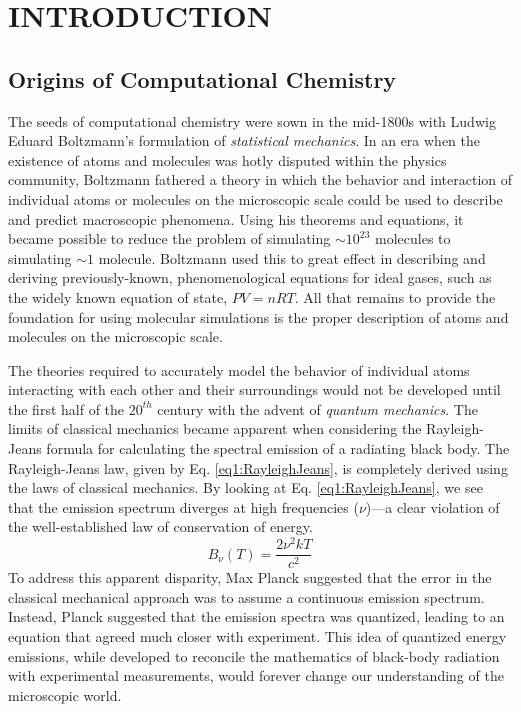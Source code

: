 \chapter{INTRODUCTION}
\label{ch1}

\section{Origins of Computational Chemistry}
The seeds of computational chemistry were sown in the mid-1800s with Ludwig
Eduard Boltzmann's formulation of \emph{statistical mechanics}. In an era when
the existence of atoms and molecules was hotly disputed within the physics
community, Boltzmann fathered a theory in which the behavior and interaction of
individual atoms or molecules on the microscopic scale could be used to
describe and predict macroscopic phenomena. Using his theorems and equations,
it became possible to reduce the problem of simulating $\sim 10^{23}$ molecules
to simulating $\sim 1$ molecule. Boltzmann used this to great effect in
describing and deriving previously-known, phenomenological equations for ideal
gases, such as the widely known equation of state, $P V = n R T$. All that
remains to provide the foundation for using molecular simulations is the proper
description of atoms and molecules on the microscopic scale.

The theories required to accurately model the behavior of individual atoms
interacting with each other and their surroundings would not be developed until
the first half of the $20^{th}$ century with the advent of \textit{quantum
mechanics}. The limits of classical mechanics became apparent when considering
the Rayleigh-Jeans formula for calculating the spectral emission of a radiating
black body. The Rayleigh-Jeans law, given by Eq. \ref{eq1:RayleighJeans}, is
completely derived using the laws of classical mechanics. By looking at Eq.
\ref{eq1:RayleighJeans}, we see that the emission spectrum diverges at high
frequencies ($\nu$)---a clear violation of the well-established law of
conservation of energy.
\begin{equation}
   B_{\nu} (T)  = \frac{2 \nu^2 k T} {c^2}
   \label{eq1:RayleighJeans}
\end{equation}
To address this apparent disparity, Max Planck suggested that the error in the
classical mechanical approach was to assume a continuous emission spectrum.
Instead, Planck suggested that the emission spectra was quantized, leading to an
equation that agreed much closer with experiment. This idea of quantized energy
emissions, while developed to reconcile the mathematics of black-body radiation
with experimental measurements, would forever change our understanding of the
microscopic world.

